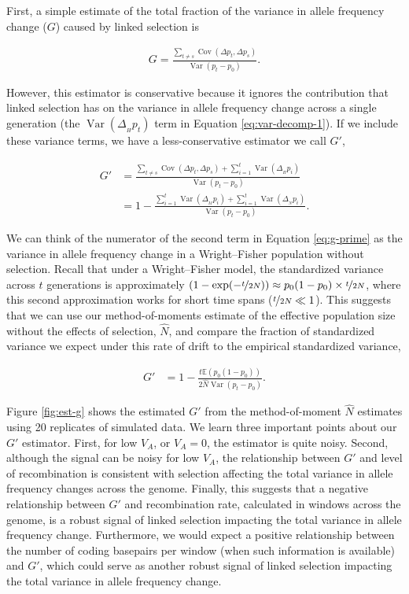 \documentclass[11pt]{article}
\newcommand{\E}{\mathbb{E}}
\DeclareMathOperator{\var}{Var}
\DeclareMathOperator{\cov}{Cov}
\begin{document}
First, a simple estimate of the total fraction of the variance in allele
frequency change ($G$) caused by linked selection is

\begin{align}
  \label{eq:g-def}
  G = \frac{\sum_{t \ne s}\cov(\Delta p_t, \Delta p_s)}{\var(p_t - p_0)}.
\end{align}

However, this estimator is conservative because it ignores the contribution
that linked selection has on the variance in allele frequency change across a
single generation (the $\var(\Delta_{_H} p_t)$ term in Equation
\ref{eq:var-decomp-1}). If we include these variance terms, we have a
less-conservative estimator we call $G'$,

\begin{align}
  G' &= \frac{\sum_{t \ne s}\cov(\Delta p_t, \Delta p_s) + \sum_{i=1}^t \var(\Delta_{_H} p_i)}{\var(p_t - p_0)} \nonumber \\
     &= 1 - \frac{\sum_{i=1}^t \var(\Delta_{_M} p_i) + \sum_{i=1}^t \var( \Delta_{_N} p_i)}{\var(p_t - p_0)}.
  \label{eq:g-prime}
\end{align}

We can think of the numerator of the second term in Equation \eqref{eq:g-prime}
as the variance in allele frequency change in a Wright--Fisher population
without selection.  Recall that under a Wright--Fisher model, the standardized
variance across $t$ generations is approximately $(1 - \exp(-\nicefrac{t}{2N}))
\approx p_0(1-p_0) \times \nicefrac{t}{2N}$, where this second approximation
works for short time spans ($\nicefrac{t}{2N} \ll 1$).  This suggests that we
can use our method-of-moments estimate of the effective population size without
the effects of selection, $\widehat{N}$, and compare the fraction of
standardized variance we expect under this rate of drift to the empirical
standardized variance,

\begin{align}
  G' &= 1 - \frac{t \E(p_{0}(1-p_{0})) }{2 \widehat{N} \var(p_{t} - p_{0}) }.
\end{align}

Figure \ref{fig:est-g} shows the estimated $G'$ from the method-of-moment
$\widehat{N}$ estimates using 20 replicates of simulated data. We learn
three important points about our $G'$ estimator. First, for low $V_A$, or $V_A
= 0$, the estimator is quite noisy. Second, although the signal can be noisy
for low $V_A$, the relationship between $G'$ and level of recombination is
consistent with selection affecting the total variance in allele frequency
changes across the genome. Finally, this suggests that a negative relationship
between $G'$ and recombination rate, calculated in windows across the genome,
is a robust signal of linked selection impacting the total variance in allele
frequency change. Furthermore, we would expect a positive relationship between
the number of coding basepairs per window (when such information is available)
and $G'$, which could serve as another robust signal of linked selection
impacting the total variance in allele frequency change.
\end{document}
